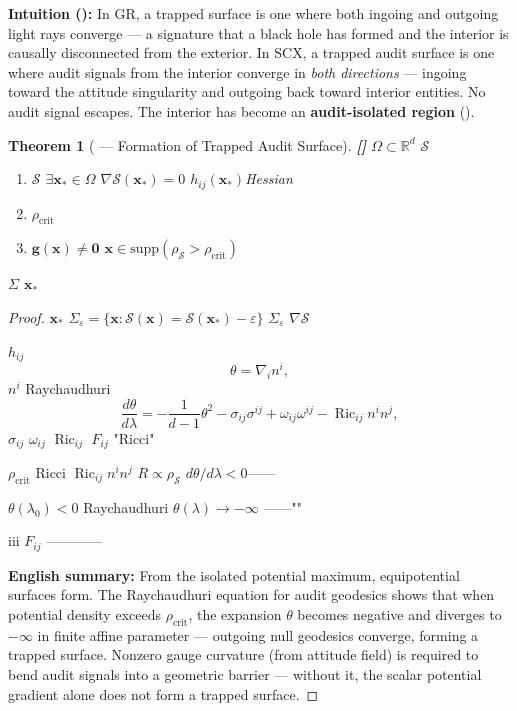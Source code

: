 \documentclass[12pt,a4paper]{article}
\newtheorem{theorem}{Theorem}[section]
\theoremstyle{remark}
\newcommand{\R}{\mathbb{R}}
\newcommand{\g}{\mathbf{g}}
\newcommand{\x}{\mathbf{x}}
\DeclareMathOperator{\Ric}{Ric}
\newcommand{\rigorFull}{\textnormal{\textbf{[]}}}
\begin{document}
\vspace{4pt}
\noindent
\textbf{Intuition ():} In GR, a trapped surface is one where both ingoing and outgoing light rays converge — a signature that a black hole has formed and the interior is causally disconnected from the exterior. In SCX, a trapped audit surface is one where audit signals from the interior converge in \textit{both directions} — ingoing toward the attitude singularity and outgoing back toward interior entities. No audit signal escapes. The interior has become an \textbf{audit-isolated region} ().

\begin{theorem}[ — Formation of Trapped Audit Surface]\label{thm:trapped_formation}\rigorFull
 $\Omega \subset \R^d$  $\mathcal{S}$ 
\begin{enumerate}[label=(\roman*)]
    \item $\mathcal{S}$  $\exists \x_* \in \Omega$  $\nabla\mathcal{S}(\x_*) = 0$  $h_{ij}(\x_*)$Hessian
    \item  $\rho_{\mathrm{crit}}$
    \item $\g(\x) \neq \mathbf{0}$  $\x \in \mathrm{supp}(\rho_{\mathcal{S}} > \rho_{\mathrm{crit}})$ 
\end{enumerate}
 $\Sigma$  $\x_*$
\end{theorem}

\begin{proof}
 $\x_*$  $\Sigma_\varepsilon = \{\x : \mathcal{S}(\x) = \mathcal{S}(\x_*) - \varepsilon\}$ $\Sigma_\varepsilon$  $\nabla\mathcal{S}$ 

 $h_{ij}$ 
\begin{equation}
    \theta = \nabla_i n^i,
\end{equation}
 $n^i$ Raychaudhuri
\begin{equation}
    \frac{d\theta}{d\lambda} = -\frac{1}{d-1}\theta^2 - \sigma_{ij}\sigma^{ij} + \omega_{ij}\omega^{ij} - \Ric_{ij}n^i n^j,
    \label{eq:raychaudhuri_audit}
\end{equation}
 $\sigma_{ij}$ $\omega_{ij}$ $\Ric_{ij}$  $F_{ij}$ "Ricci"

 $\rho_{\mathrm{crit}}$ Ricci $\Ric_{ij}n^i n^j$  $R \propto \rho_{\mathcal{S}}$ $d\theta/d\lambda < 0$——

 $\theta(\lambda_0) < 0$ Raychaudhuri $\theta(\lambda) \to -\infty$ ——""

 iii $F_{ij}$ ——\textbf{}——

\textbf{English summary:} From the isolated potential maximum, equipotential surfaces form. The Raychaudhuri equation for audit geodesics shows that when potential density exceeds $\rho_{\mathrm{crit}}$, the expansion $\theta$ becomes negative and diverges to $-\infty$ in finite affine parameter — outgoing null geodesics converge, forming a trapped surface. Nonzero gauge curvature (from attitude field) is required to bend audit signals into a geometric barrier — without it, the scalar potential gradient alone does not form a trapped surface.
\end{proof}
\end{document}

